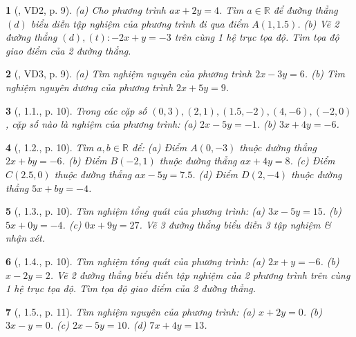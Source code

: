 \documentclass{article}
\newtheorem{baitoan}{}
\begin{document}
\begin{baitoan}[\cite{Binh_boi_duong_Toan_9_tap_2}, VD2, p. 9]
	(a) Cho phương trình $ax + 2y = 4$. Tìm $a\in\mathbb{R}$ để đường thẳng $(d)$ biểu diễn tập nghiệm của phương trình đi qua điểm $A(1,1.5)$. (b) Vẽ 2 đường thẳng $(d),(t):-2x + y = -3$ trên cùng 1 hệ trục tọa độ. Tìm tọa độ giao điểm của 2 đường thẳng.
\end{baitoan}

\begin{baitoan}[\cite{Binh_boi_duong_Toan_9_tap_2}, VD3, p. 9]
	(a) Tìm nghiệm nguyên của phương trình $2x - 3y = 6$. (b) Tìm nghiệm nguyên dương của phương trình $2x + 5y = 9$.
\end{baitoan}

\begin{baitoan}[\cite{Binh_boi_duong_Toan_9_tap_2}, 1.1., p. 10]
	Trong các cặp số $(0,3),(2,1),(1.5,-2),(4,-6),(-2,0)$, cặp số nào là nghiệm của phương trình: (a) $2x - 5y = -1$. (b) $3x + 4y = -6$.
\end{baitoan}

\begin{baitoan}[\cite{Binh_boi_duong_Toan_9_tap_2}, 1.2., p. 10]
	Tìm $a,b\in\mathbb{R}$ để: (a) Điểm $A(0,-3)$ thuộc đường thẳng $2x + by = -6$. (b) Điểm $B(-2,1)$ thuộc đường thẳng $ax + 4y = 8$. (c) Điểm $C(2.5,0)$ thuộc đường thẳng $ax - 5y = 7.5$. (d) Điểm $D(2,-4)$ thuộc đường thẳng $5x + by = -4$.
\end{baitoan}

\begin{baitoan}[\cite{Binh_boi_duong_Toan_9_tap_2}, 1.3., p. 10]
	Tìm nghiệm tổng quát của phương trình: (a) $3x - 5y = 15$. (b) $5x + 0y = -4$. (c) $0x + 9y = 27$. Vẽ 3 đường thẳng biểu diễn 3 tập nghiệm \& nhận xét.
\end{baitoan}

\begin{baitoan}[\cite{Binh_boi_duong_Toan_9_tap_2}, 1.4., p. 10]
	Tìm nghiệm tổng quát của phương trình: (a) $2x + y = -6$. (b) $x - 2y = 2$. Vẽ 2 đường thẳng biểu diễn tập nghiệm của 2 phương trình trên cùng 1 hệ trục tọa độ. Tìm tọa độ giao điểm của 2 đường thẳng.
\end{baitoan}

\begin{baitoan}[\cite{Binh_boi_duong_Toan_9_tap_2}, 1.5., p. 11]
	Tìm nghiệm nguyên của phương trình: (a) $x + 2y = 0$. (b) $3x - y = 0$. (c) $2x - 5y = 10$. (d) $7x + 4y = 13$.
\end{baitoan}
\end{document}
